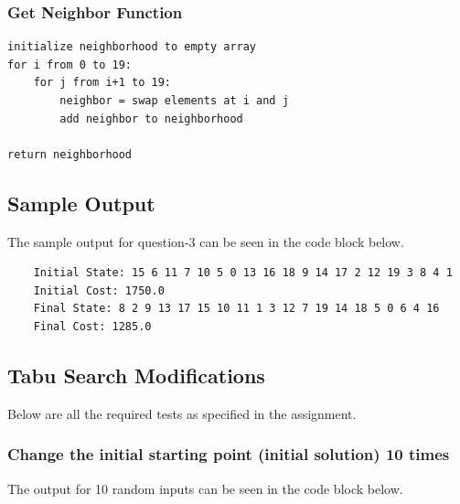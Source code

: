 \documentclass{article}
\begin{document}
\subsubsection{Get Neighbor Function}

\begin{lstlisting}
initialize neighborhood to empty array
for i from 0 to 19:
    for j from i+1 to 19:
        neighbor = swap elements at i and j
        add neighbor to neighborhood

return neighborhood
\end{lstlisting}

\subsection{Sample Output}
The sample output for question-3 can be seen in the code block below.
\begin{lstlisting}
    Initial State: 15 6 11 7 10 5 0 13 16 18 9 14 17 2 12 19 3 8 4 1
    Initial Cost: 1750.0
    Final State: 8 2 9 13 17 15 10 11 1 3 12 7 19 14 18 5 0 6 4 16
    Final Cost: 1285.0
\end{lstlisting}

\subsection{Tabu Search Modifications}

Below are all the required tests as specified in the assignment.

\subsubsection{Change the initial starting point (initial solution) 10 times}

The output for 10 random inputs can be seen in the code block below.
\end{document}
